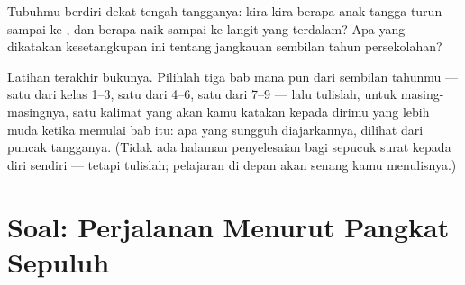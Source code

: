 \begin{exercise}[$\star\star$]\label{exo:g9:atoms-to-galaxies:11}
Tubuhmu berdiri dekat tengah tangganya: kira-kira berapa anak tangga
turun sampai ke , dan berapa naik sampai ke langit yang
terdalam? Apa yang dikatakan kesetangkupan ini tentang jangkauan
sembilan tahun persekolahan?
\end{exercise}

\begin{exercise}[$\star\star\star$]\label{exo:g9:atoms-to-galaxies:12}
Latihan terakhir bukunya. Pilihlah tiga bab mana pun dari sembilan
tahunmu --- satu dari kelas 1--3, satu dari 4--6, satu dari 7--9 ---
lalu tulislah, untuk masing-masingnya, satu kalimat yang akan kamu
katakan kepada dirimu yang lebih muda ketika memulai bab itu: apa yang
sungguh diajarkannya, dilihat dari puncak tangganya. (Tidak ada
halaman penyelesaian bagi sepucuk surat kepada diri sendiri ---
tetapi tulislah; pelajaran di depan akan senang kamu menulisnya.)
\end{exercise}

\section{Soal: Perjalanan Menurut Pangkat Sepuluh}

